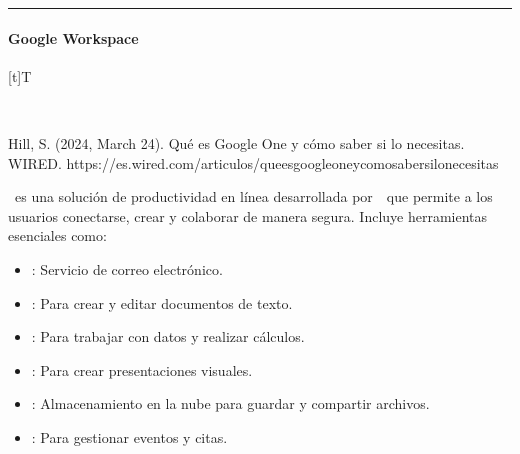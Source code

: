 \documentclass[letterpaper,10pt,spanish]{sphinxmanual}
\let\sphinxpxdimen\pdfpxdimen\else\newdimen\sphinxpxdimen
\begin{document}
\bigskip\hrule\bigskip



\paragraph{Google Workspace}
\label{\detokenize{cursos/ofimatica10/recursos/T01:google-workspace}}

\begin{savenotes}\sphinxattablestart
\sphinxthistablewithglobalstyle
\centering
\begin{tabulary}{\linewidth}[t]{T}
\sphinxtoprule
\sphinxtableatstartofbodyhook

\begin{sphinxfigure-in-table}
\centering
\capstart
\noindent\sphinxincludegraphics[width=700\sphinxpxdimen]{{image023}.png}
\label{\detokenize{cursos/ofimatica10/recursos/T01:id9}}\end{sphinxfigure-in-table}\relax
\\
\sphinxbottomrule
\end{tabulary}
\sphinxtableafterendhook\par
\sphinxattableend\end{savenotes}

\sphinxAtStartPar
%
\begin{footnote}[2]\sphinxAtStartFootnote
Hill, S. (2024, March 24). Qué es Google One y cómo saber si lo necesitas. WIRED. https://es.wired.com/articulos/que\sphinxhyphen{}es\sphinxhyphen{}google\sphinxhyphen{}one\sphinxhyphen{}y\sphinxhyphen{}como\sphinxhyphen{}saber\sphinxhyphen{}si\sphinxhyphen{}lo\sphinxhyphen{}necesitas
%
\end{footnote}  es una solución de productividad en línea desarrollada por  que permite a los usuarios conectarse, crear y colaborar de manera segura. Incluye herramientas esenciales como:
\begin{itemize}
\item {} 
\sphinxAtStartPar
{}: Servicio de correo electrónico.

\item {} 
\sphinxAtStartPar
{}: Para crear y editar documentos de texto.

\item {} 
\sphinxAtStartPar
{}: Para trabajar con datos y realizar cálculos.

\item {} 
\sphinxAtStartPar
{}: Para crear presentaciones visuales.

\item {} 
\sphinxAtStartPar
{}: Almacenamiento en la nube para guardar y compartir archivos.

\item {} 
\sphinxAtStartPar
{}: Para gestionar eventos y citas.

\end{itemize}
\end{document}

